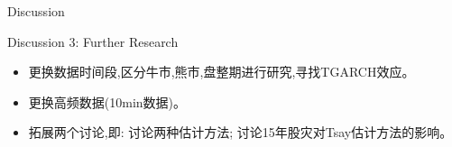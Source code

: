 \documentclass{beamer}
\begin{document}
\begin{frame}{Discussion}
  \begin{block}{Discussion 3: Further Research}
    \begin{itemize}
      \item 更换数据时间段,区分牛市,熊市,盘整期进行研究,寻找TGARCH效应。\\
      \item 更换高频数据(10min数据)。\\
      \item 拓展两个讨论,即: 讨论两种估计方法; 讨论15年股灾对Tsay估计方法的影响。
    \end{itemize}
  \end{block}
\end{frame}

\end{document}
